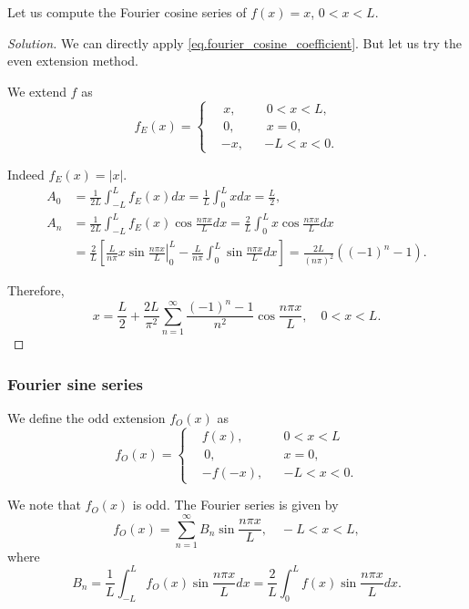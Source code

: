 \begin{example}[]\label{ex.|x|_fourier}
    Let us compute the Fourier cosine series of $f(x)=x$, $0<x<L$.
\end{example}
\begin{proof}[Solution]
We can directly apply \eqref{eq.fourier_cosine_coefficient}. But let us try the even extension method.
    
We extend $f$ as
$$
f_E(x)=\left\{\begin{aligned}
&\,x, && \,0<x<L, \\
&\,0, && \,x=0, \\
&-x, && -L<x<0 .
\end{aligned}\right.
$$

Indeed $f_E(x)=|x|$.
$$
\begin{aligned}
A_0 & =\frac{1}{2 L} \int_{-L}^L f_E(x) d x=\frac{1}{L} \int_0^L x d x=\frac{L}{2}, \\
A_n & =\frac{1}{2 L} \int_{-L}^L f_E(x) \cos \frac{n \pi x}{L} d x=\frac{2}{L} \int_0^L x \cos \frac{n \pi x}{L} d x \\
& =\frac{2}{L}\left[\left.\frac{L}{n \pi} x \sin \frac{n \pi x}{L}\right|_0 ^L-\frac{L}{n \pi} \int_0^L \sin \frac{n \pi x}{L} d x\right]=\frac{2 L}{(n \pi)^2}\left((-1)^n-1\right) .
\end{aligned}
$$

Therefore,
$$
x=\frac{L}{2}+\frac{2 L}{\pi^2} \sum_{n=1}^{\infty} \frac{(-1)^n-1}{n^2} \cos \frac{n \pi x}{L}, \quad 0<x<L .
$$
\end{proof}


\subsubsection{Fourier sine series}

We define the odd extension $f_O(x)$ as
\begin{equation}\label{eq.odd_extension}
    f_O(x)=\left\{\begin{aligned}
        &f(x), && 0<x<L 
        \\
        &\,0, && x=0, 
        \\
        &-f(-x), && -L<x<0 .
        \end{aligned}\right.
\end{equation}

We note that $f_O(x)$ is odd. The Fourier series is given by
$$
f_O(x)=\sum_{n=1}^{\infty} B_n \sin \frac{n \pi x}{L}, \quad-L<x<L,
$$
where
$$
B_n=\frac{1}{L} \int_{-L}^L f_O(x) \sin \frac{n \pi x}{L} d x=\frac{2}{L} \int_0^L f(x) \sin \frac{n \pi x}{L} d x .
$$

